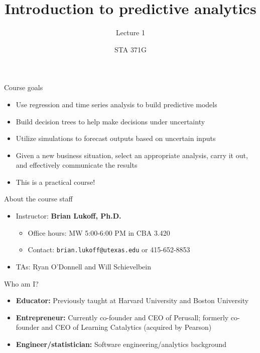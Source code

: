 \documentclass{beamer}\usepackage[]{graphicx}\usepackage[]{color}
\title{Introduction to predictive analytics}
\subtitle{Lecture 1}
\author{STA 371G}
\begin{document}
  
  

  \frame{\maketitle}



  \begin{darkframes}
    \begin{frame}{Course goals}
      \begin{itemize}
        \item Use regression and time series analysis to build predictive models
        \item Build decision trees to help make decisions under uncertainty
        \item Utilize simulations to forecast outputs based on uncertain inputs
        \item Given a new business situation, select an appropriate analysis, carry it out, and effectively communicate the results
        \item \alert{This is a practical course!}
      \end{itemize}
    \end{frame}

    \begin{frame}{About the course staff}
      \begin{itemize}
        \item Instructor: \textbf{Brian Lukoff, Ph.D.}
          \begin{itemize}
            \item Office hours: MW 5:00-6:00 PM in CBA 3.420
            \item Contact: \texttt{brian.lukoff@utexas.edu} or 415-652-8853
          \end{itemize}
        \item TAs: Ryan O'Donnell and Will Schievelbein
      \end{itemize}
    \end{frame}

    \begin{frame}{Who am I?}
      \begin{itemize}
        \item \textbf{Educator:} Previously taught at Harvard University and Boston University
        \item \textbf{Entrepreneur:} Currently co-founder and CEO of Perusall; formerly co-founder and CEO of Learning Catalytics (acquired by Pearson)
        \item \textbf{Engineer/statistician:} Software engineering/analytics background
      \end{itemize}
    \end{frame}


\end{darkframes}
\end{document}
